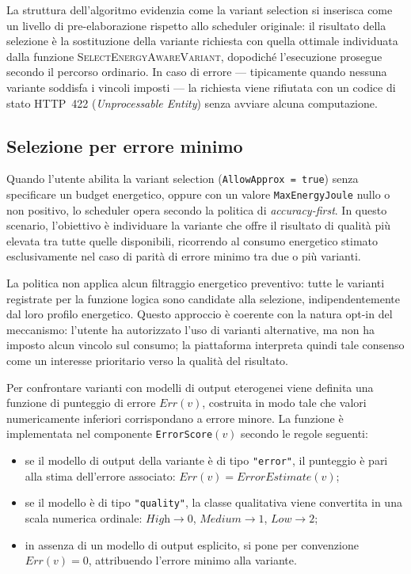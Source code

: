 La struttura dell'algoritmo evidenzia come la variant selection si
inserisca come un livello di pre-elaborazione rispetto allo scheduler
originale: il risultato della selezione è la sostituzione della variante
richiesta con quella ottimale individuata dalla funzione
\textsc{SelectEnergyAwareVariant}, dopodiché l'esecuzione prosegue
secondo il percorso ordinario. In caso di errore — tipicamente quando
nessuna variante soddisfa i vincoli imposti — la richiesta viene rifiutata
con un codice di stato HTTP~422 (\textit{Unprocessable Entity}) senza
avviare alcuna computazione.


\subsection{Selezione per errore minimo}
\label{sec:scheduler:error}

Quando l'utente abilita la variant selection (\texttt{AllowApprox = true})
senza specificare un budget energetico, oppure con un valore
\texttt{MaxEnergyJoule} nullo o non positivo, lo scheduler opera secondo
la politica di \textit{accuracy-first}. In questo scenario, l'obiettivo è individuare la
variante che offre il risultato di qualità più elevata tra tutte quelle
disponibili, ricorrendo al consumo energetico stimato esclusivamente nel caso di parità di errore minimo tra due o più varianti.

La politica non applica alcun filtraggio energetico preventivo: tutte le
varianti registrate per la funzione logica sono candidate alla selezione,
indipendentemente dal loro profilo energetico. Questo approccio è coerente
con la natura opt-in del meccanismo: l'utente ha autorizzato l'uso di
varianti alternative, ma non ha imposto alcun vincolo sul consumo; la
piattaforma interpreta quindi tale consenso come un interesse prioritario
verso la qualità del risultato.

Per confrontare varianti con modelli di output eterogenei viene definita
una funzione di punteggio di errore $Err(v)$, costruita in modo tale
che valori numericamente inferiori corrispondano a errore minore.
La funzione è implementata nel componente \texttt{ErrorScore}$(v)$
secondo le regole seguenti:

\begin{itemize}
  \item se il modello di output della variante è di tipo \texttt{"error"},
        il punteggio è pari alla stima dell'errore associato:
        $Err(v) = \textit{ErrorEstimate}(v)$;

  \item se il modello è di tipo \texttt{"quality"}, la classe qualitativa
        viene convertita in una scala numerica ordinale:
        $\textit{High} \to 0$, $\textit{Medium} \to 1$, $\textit{Low} \to 2$;

  \item in assenza di un modello di output esplicito, si pone per
        convenzione $Err(v) = 0$, attribuendo l'errore minimo alla
        variante.
\end{itemize}

